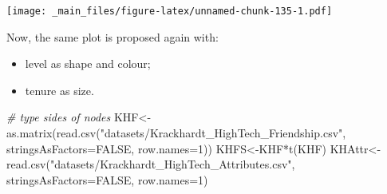 \documentclass[
  notitlepage,
  onecolumn,
  openany]{book}
\newenvironment{Shaded}{\begin{snugshade}}{\end{snugshade}}
\newcommand{\AttributeTok}[1]{\textcolor[rgb]{0.77,0.63,0.00}{#1}}
\newcommand{\CommentTok}[1]{\textcolor[rgb]{0.56,0.35,0.01}{\textit{#1}}}
\newcommand{\ConstantTok}[1]{\textcolor[rgb]{0.00,0.00,0.00}{#1}}
\newcommand{\DecValTok}[1]{\textcolor[rgb]{0.00,0.00,0.81}{#1}}
\newcommand{\FunctionTok}[1]{\textcolor[rgb]{0.00,0.00,0.00}{#1}}
\newcommand{\NormalTok}[1]{#1}
\newcommand{\OtherTok}[1]{\textcolor[rgb]{0.56,0.35,0.01}{#1}}
\newcommand{\SpecialCharTok}[1]{\textcolor[rgb]{0.00,0.00,0.00}{#1}}
\newcommand{\StringTok}[1]{\textcolor[rgb]{0.31,0.60,0.02}{#1}}
\providecommand{\tightlist}{%
  \setlength{\itemsep}{0pt}\setlength{\parskip}{0pt}}
\begin{document}
\texttt{[image: \_main\_files/figure-latex/unnamed-chunk-135-1.pdf]}

Now, the same plot is proposed again with:

\begin{itemize}
\tightlist
\item
  level as shape and colour;
\item
  tenure as size.
\end{itemize}

\begin{Shaded}
\begin{Highlighting}[]
\CommentTok{\# type sides of nodes}
\NormalTok{KHF}\OtherTok{\textless{}{-}}\FunctionTok{as.matrix}\NormalTok{(}\FunctionTok{read.csv}\NormalTok{(}\StringTok{"datasets/Krackhardt\_HighTech\_Friendship.csv"}\NormalTok{,}
                        \AttributeTok{stringsAsFactors=}\ConstantTok{FALSE}\NormalTok{, }\AttributeTok{row.names=}\DecValTok{1}\NormalTok{))}
\NormalTok{KHFS}\OtherTok{\textless{}{-}}\NormalTok{KHF}\SpecialCharTok{*}\FunctionTok{t}\NormalTok{(KHF)}
\NormalTok{KHAttr}\OtherTok{\textless{}{-}}\FunctionTok{read.csv}\NormalTok{(}\StringTok{"datasets/Krackhardt\_HighTech\_Attributes.csv"}\NormalTok{,}
                 \AttributeTok{stringsAsFactors=}\ConstantTok{FALSE}\NormalTok{, }\AttributeTok{row.names=}\DecValTok{1}\NormalTok{)}


\end{Highlighting}
\end{Shaded}
\end{document}
